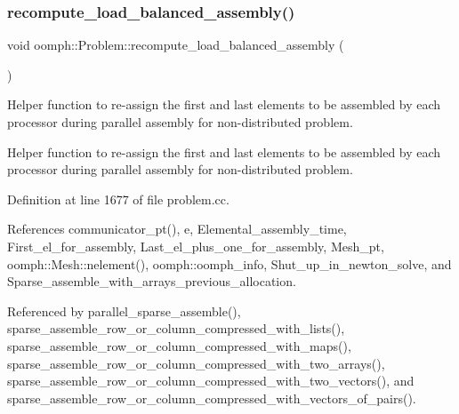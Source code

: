 \mbox{\label{classoomph_1_1Problem_aa9d808bb5d62db0da8e962fa29c24af9}} 
\subsubsection{\texorpdfstring{recompute\+\_\+load\+\_\+balanced\+\_\+assembly()}{recompute\_load\_balanced\_assembly()}}
{\footnotesize\ttfamily void oomph\+::\+Problem\+::recompute\+\_\+load\+\_\+balanced\+\_\+assembly (\begin{DoxyParamCaption}{ }\end{DoxyParamCaption})\hspace{0.3cm}{\ttfamily [private]}}



Helper function to re-\/assign the first and last elements to be assembled by each processor during parallel assembly for non-\/distributed problem. 

Helper function to re-\/assign the first and last elements to be assembled by each processor during parallel assembly for non-\/distributed problem. 

Definition at line 1677 of file problem.\+cc.



References communicator\+\_\+pt(), e, Elemental\+\_\+assembly\+\_\+time, First\+\_\+el\+\_\+for\+\_\+assembly, Last\+\_\+el\+\_\+plus\+\_\+one\+\_\+for\+\_\+assembly, Mesh\+\_\+pt, oomph\+::\+Mesh\+::nelement(), oomph\+::oomph\+\_\+info, Shut\+\_\+up\+\_\+in\+\_\+newton\+\_\+solve, and Sparse\+\_\+assemble\+\_\+with\+\_\+arrays\+\_\+previous\+\_\+allocation.



Referenced by parallel\+\_\+sparse\+\_\+assemble(), sparse\+\_\+assemble\+\_\+row\+\_\+or\+\_\+column\+\_\+compressed\+\_\+with\+\_\+lists(), sparse\+\_\+assemble\+\_\+row\+\_\+or\+\_\+column\+\_\+compressed\+\_\+with\+\_\+maps(), sparse\+\_\+assemble\+\_\+row\+\_\+or\+\_\+column\+\_\+compressed\+\_\+with\+\_\+two\+\_\+arrays(), sparse\+\_\+assemble\+\_\+row\+\_\+or\+\_\+column\+\_\+compressed\+\_\+with\+\_\+two\+\_\+vectors(), and sparse\+\_\+assemble\+\_\+row\+\_\+or\+\_\+column\+\_\+compressed\+\_\+with\+\_\+vectors\+\_\+of\+\_\+pairs().

